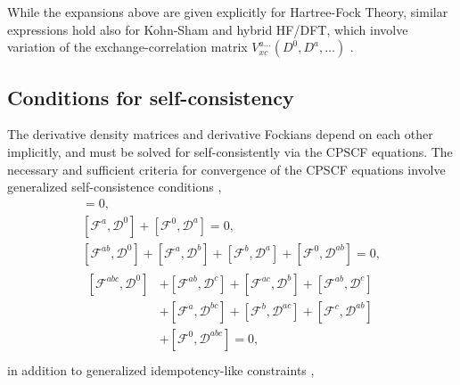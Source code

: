 \documentclass[prl,twocolumn,showpacs,twocolumngrid,superbib]{revtex4}
\def\F{\mathcal{F}}
\def\D{\mathcal{D}}
\begin{document}
While the expansions above are given explicitly for Hartree-Fock Theory, similar expressions 
hold also for Kohn-Sham and hybrid HF/DFT,  which involve variation of the exchange-correlation 
matrix $V_{xc}^{a\ldots}(D^0,D^a,\ldots)$ \cite{ALee94,PSalek02}.

\subsection{Conditions for self-consistency}\label{SelfConsistency}

The derivative density matrices and derivative Fockians depend on 
each other implicitly, and must be solved for self-consistently
via the CPSCF equations.
The necessary and sufficient criteria for convergence of the 
CPSCF equations involve generalized self-consistence conditions \cite{Furche_2001},
\begin{gather}
    [\F^{0} ,\D^{0}]=0,\label{eq:commutators1}\\
    [\F^{a} ,\D^{0}]+[\F^{0},\D^{a}]=0,\label{eq:commutators2}\\
    [\F^{ab},\D^{0}]+[\F^{a},\D^{b}]+[\F^{b},\D^{a}]+[\F^{0},\D^{ab}]=0,\label{eq:commutators3}\\
  \begin{split}
    [\F^{abc},\D^{0}]&+[\F^{ab},\D^{c}]+[\F^{ac},\D^{b}]+[\F^{ab},\D^{c}]\\
    &+[\F^{a},\D^{bc}]+[\F^{b},\D^{ac}]+[\F^{c},\D^{ab}]\\
    &+[\F^{0},\D^{abc}]=0,\label{eq:commutators4}\\
  \end{split}
\end{gather}
in addition to generalized idempotency-like constraints \cite{Furche_2001},
\end{document}
